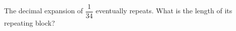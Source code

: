 The decimal expansion of $\dfrac{1}{34}$ eventually repeats. What is the length of its repeating block?
